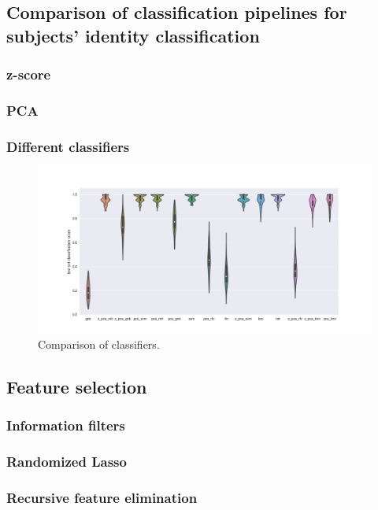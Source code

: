 \documentclass[12pt, a4paper, final, fleqn]{article}
\begin{document}
\subsection{Comparison of classification pipelines for subjects' identity classification}
\subsubsection{z-score}
\subsubsection{PCA}
\subsubsection{Different classifiers}

\begin{figure}[!htb]
\begin{center}
\includegraphics[width=0.89\columnwidth]{comparison_clf_subj_moviedata}
  \caption[Comparison of classifiers]{Comparison of classifiers.
	  \label{fig:clf_comp}}
\end{center}
\end{figure}
\subsection{Feature selection}
\subsubsection{Information filters}
\subsubsection{Randomized Lasso}
\subsubsection{Recursive feature elimination}
\end{document}
